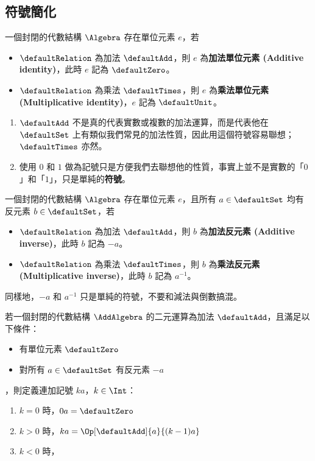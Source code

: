 \documentclass[12pt,a4paper,oneside]{report}
\begin{document}
\begin{CJK}{UTF8}{bkai}
\subsection{符號簡化}

\begin{mydef}[單位元素記號]
\label{def:algebra:identity_notation}
一個封閉的代數結構 $\Algebra$ 存在單位元素 $e$，若
\begin{itemize}
\item $\defaultRelation$ 為加法 $\defaultAdd$，則 $e$ 為\textbf{加法單位元素 (Additive identity)}，此時 $e$ 記為 $\defaultZero$。
\item $\defaultRelation$ 為乘法 $\defaultTimes$，則 $e$ 為\textbf{乘法單位元素 (Multiplicative identity)}，$e$ 記為 $\defaultUnit$。
\end{itemize}
\end{mydef}
\begin{mynote*}
\begin{enumerate}
\item $\defaultAdd$ 不是真的代表實數或複數的加法運算，而是代表他在 $\defaultSet$ 上有類似我們常見的加法性質，因此用這個符號容易聯想；$\defaultTimes$ 亦然。
\item 使用 $0$ 和 $1$ 做為記號只是方便我們去聯想他的性質，事實上並不是實數的「$0$」和「$1$」，只是單純的\textbf{符號}。
\end{enumerate}
\end{mynote*}

\begin{mydef}[反元素記號]
\label{def:algebra:inverse_notation}
一個封閉的代數結構 $\Algebra$ 存在單位元素 $e$，且所有 $a\in{\defaultSet}$ 均有反元素 $b\in{\defaultSet}$，若
\begin{itemize}
\item $\defaultRelation$ 為加法 $\defaultAdd$，則 $b$ 為\textbf{加法反元素 (Additive inverse)}，此時 $b$ 記為 $-a$。
\item $\defaultRelation$ 為乘法 $\defaultTimes$，則 $b$ 為\textbf{乘法反元素 (Multiplicative inverse)}，此時 $b$ 記為 $a^{-1}$。
\end{itemize}
\end{mydef}
\begin{mynote*}
同樣地，$-a$ 和 $a^{-1}$ 只是單純的符號，不要和減法與倒數搞混。
\end{mynote*}

\begin{mydef}[連加記號]
\label{def:algebra:accumulating_additive_notation}
若一個封閉的代數結構 $\AddAlgebra$ 的二元運算為加法 $\defaultAdd$，且滿足以下條件：
\begin{itemize}
\item 有單位元素 $\defaultZero$
\item 對所有 $a\in{\defaultSet}$ 有反元素 $-a$
\end{itemize}
，則定義連加記號 $ka$，$k\in{\Int}$：
\begin{enumerate}
\item $k=0$ 時，$0a=\defaultZero$
\item $k>0$ 時，$ka=\Op[\defaultAdd]{a}{{(k-1)}a}$
\item $k<0$ 時，
\end{enumerate}
\end{mydef}


\end{CJK}
\end{document}
